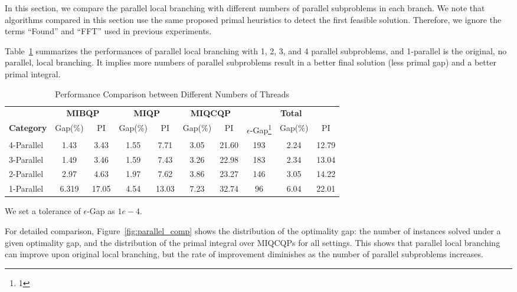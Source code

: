 \documentclass[]{article}
\begin{document}
In this section, we compare the parallel local branching with different numbers of parallel subproblems in each branch. We note that algorithms compared in this section use the same proposed primal heuristics to detect the first feasible solution. Therefore, we ignore the terms ``Found'' and ``FFT'' used in previous experiments.

Table~\ref{tab:parallel_comp} summarizes the performances of parallel local branching with 1, 2, 3, and 4 parallel subproblems, and 1-parallel is the original, no parallel, local branching. It implies more numbers of parallel subproblems result in a better final solution (less primal gap) and a better primal integral.

\begin{table}[!htbp]
\centering
\setlength{\tabcolsep}{1.5mm}
\caption{Performance Comparison between Different Numbers of Threads}
\begin{threeparttable}
\begin{tabular}{lccccccccc}
\toprule
& \multicolumn{2}{c}{\textbf{MIBQP}} & \multicolumn{2}{c}{\textbf{MIQP}}& \multicolumn{2}{c}{\textbf{MIQCQP}} & \multicolumn{3}{c}{\textbf{Total}}\\
\cmidrule(lr){2-3} \cmidrule(lr){4-5} \cmidrule(lr){6-7} \cmidrule(lr){8-10}
\textbf{Category} &Gap(\%) &PI &Gap(\%) &PI &Gap(\%) &PI &$\epsilon$-Gap\footnote{1} &Gap(\%) &PI \\
\midrule
4-Parallel   &1.43 &3.43 &1.55 &7.71 &3.05 &21.60 &193 &2.24 &12.79\\
3-Parallel   &1.49 &3.46 &1.59 &7.43 &3.26 &22.98 &183 &2.34 &13.04 \\
2-Parallel   &2.97 &4.63 &1.97 &7.62 &3.86 &23.27 &146 &3.05 &14.22 \\ 
1-Parallel   &6.319 &17.05 &4.54 &13.03 &7.23 &32.74&96 &6.04 &22.01 \\
\bottomrule
\end{tabular}
\begin{tablenotes}
    \footnotesize
    \item[2] We set a tolerance of $\epsilon$-Gap as $1e-4$.
\end{tablenotes}
\end{threeparttable}
\label{tab:parallel_comp}
\end{table}

For detailed comparison, Figure~\ref{fig:parallel_comp} shows the distribution of the optimality gap: the number of instances solved under a given optimality gap, and the distribution of the primal integral over MIQCQPs for all settings. This shows that parallel local branching can improve upon original local branching, but the rate of improvement diminishes as the number of parallel subproblems increases.
\end{document}
